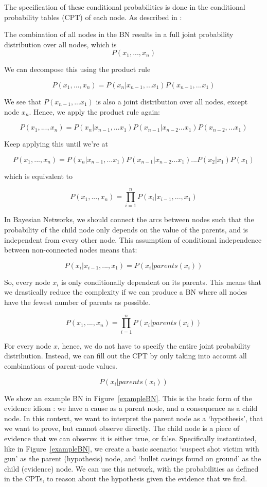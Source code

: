 \documentclass[12pt]{article}
\begin{document}
 The specification of these conditional probabilities is done in the conditional probability tables (CPT) of each node. As described in \citep{russellNorvig2010}:


The combination of all nodes in the BN results in a full joint probability distribution over all nodes, which is 
\[P(x_1, ..., x_n)\]

We can decompose this using the product rule

\[P(x_1, ..., x_n) =  P(x_n|x_{n-1},... x_1) P(x_{n-1},...x_1)\]

We see that $P(x_{n-1},...x_1)$ is also a joint distribution over all nodes, except node $x_n$. Hence, we apply the product rule again:

\[P(x_1, ..., x_n) =  P(x_n|x_{n-1},... x_1) P(x_{n-1}| x_{n-2}...x_1) P(x_{n-2},...x_1)\]

Keep applying this until we're at

\[P(x_1, ..., x_n) =  P(x_n|x_{n-1},... x_1) P(x_{n-1}| x_{n-2}...x_1) ... P(x_2 | x_1)P(x_1)\]

which is equivalent to 

\[P(x_1, ..., x_n) =  \prod_{i=1}^n P(x_i | x_{i-1},..., x_1)\]

In Bayesian Networks, we should connect the arcs between nodes such that the probability of the child node only depends on the value of the parents, and is independent from every other node. This assumption of conditional independence between non-connected nodes means that:

\[ P(x_i | x_{i-1},..., x_1) = P(x_i | parents(x_i))\]

So, every node $x_i$ is only conditionally dependent on its parents. This means that we drastically reduce the complexity if we can produce a BN where all nodes have the fewest number of parents as possible.

\[P(x_1, ..., x_n) =  \prod_{i=1}^n P(x_i | parents(x_i))\]

For every node $x$, hence, we do not have to specify the entire joint probability distribution. Instead, we can fill out the CPT by only taking into account all combinations of parent-node values.

\[P(x_i | parents(x_i))\]


We show an example BN in Figure~\ref{exampleBN}. This is the basic form of the evidence idiom \citep{Fenton2012}: we have a cause as a parent node, and a consequence as a child node. In this context, we want to interpret the parent node as a `hypothesis', that we want to prove, but cannot observe directly. The child node is a piece of evidence that we can observe: it is either true, or false. Specifically instantiated, like in Figure~\ref{exampleBN}, we create a basic scenario: `suspect shot victim with gun' as the parent (hypothesis) node, and `bullet casings found on ground' as the child (evidence) node. We can use this network, with the probabilities as defined in the CPTs, to reason about the hypothesis given the evidence that we find.
 
\end{document}
